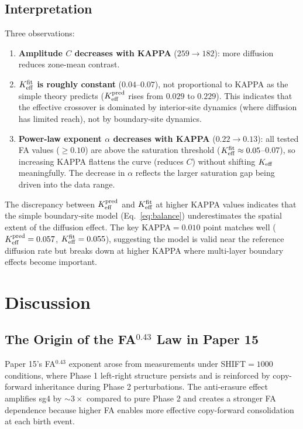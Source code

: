 \documentclass[11pt]{article}
\begin{document}
\subsection{Interpretation}

Three observations:
\begin{enumerate}
\item \textbf{Amplitude $C$ decreases with KAPPA} ($259 \to 182$): more diffusion
  reduces zone-mean contrast.
\item \textbf{$K_{\rm eff}^{\rm fit}$ is roughly constant} ($0.04$--$0.07$), not
  proportional to KAPPA as the simple theory predicts ($K_{\rm eff}^{\rm pred}$
  rises from $0.029$ to $0.229$). This indicates that the effective crossover
  is dominated by interior-site dynamics (where diffusion has limited reach),
  not by boundary-site dynamics.
\item \textbf{Power-law exponent $\alpha$ decreases with KAPPA} ($0.22 \to 0.13$):
  all tested FA values ($\geq 0.10$) are above the saturation threshold
  ($K_{\rm eff}^{\rm fit} \approx 0.05$--$0.07$), so increasing KAPPA flattens
  the curve (reduces $C$) without shifting $K_{\rm eff}$ meaningfully.
  The decrease in $\alpha$ reflects the larger saturation gap being driven
  into the data range.
\end{enumerate}

The discrepancy between $K_{\rm eff}^{\rm pred}$ and $K_{\rm eff}^{\rm fit}$
at higher KAPPA values indicates that the simple boundary-site model
(Eq.~\ref{eq:balance}) underestimates the spatial extent of the diffusion
effect.
The key KAPPA$=0.010$ point matches well ($K_{\rm eff}^{\rm pred}=0.057$,
$K_{\rm eff}^{\rm fit}=0.055$), suggesting the model is valid near the
reference diffusion rate but breaks down at higher KAPPA where multi-layer
boundary effects become important.

\section{Discussion}

\subsection{The Origin of the FA$^{0.43}$ Law in Paper 15}

Paper 15's FA$^{0.43}$ exponent arose from measurements under SHIFT$=1000$
conditions, where Phase 1 left-right structure persists and is reinforced
by copy-forward inheritance during Phase 2 perturbations.
The anti-erasure effect amplifies sg4 by $\sim 3\times$ compared to
pure Phase 2 and creates a stronger FA dependence because higher FA
enables more effective copy-forward consolidation at each birth event.
\end{document}
